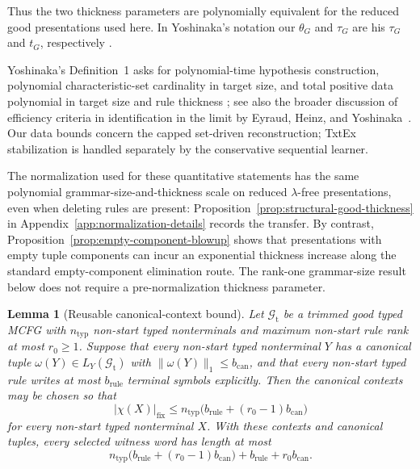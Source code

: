 \documentclass[11pt]{article}
\numberwithin{equation}{section}
\theoremstyle{plain}
\newtheorem{lemma}[theorem]{Lemma}
\theoremstyle{definition}
\theoremstyle{remark}
\begin{document}
Thus the two thickness parameters are polynomially equivalent for the reduced
good presentations used here.  In Yoshinaka's notation our $\theta_G$ and
$\tau_G$ are his $\tau_G$ and $t_G$, respectively
\cite[Section~4.3]{Yoshinaka2011}.

Yoshinaka's Definition~1 asks for polynomial-time hypothesis construction,
polynomial characteristic-set cardinality in target size, and total positive
data polynomial in target size and rule thickness
\cite[Definition~1]{Yoshinaka2011}; see also the broader discussion of
efficiency criteria in identification in the limit by Eyraud, Heinz, and
Yoshinaka~\cite{EyraudHeinzYoshinaka2016}.  Our data bounds concern the capped
set-driven reconstruction; TxtEx stabilization is handled separately by the
conservative sequential learner.

The normalization used for these quantitative statements has the same
polynomial grammar-size-and-thickness scale on reduced $\lambda$-free
presentations, even when deleting rules are present:
Proposition~\ref{prop:structural-good-thickness} in
Appendix~\ref{app:normalization-details} records the transfer.  By contrast,
Proposition~\ref{prop:empty-component-blowup} shows that presentations with
empty tuple components can incur an exponential thickness increase along the
standard empty-component elimination route.  The rank-one grammar-size result
below does not require a pre-normalization thickness parameter.

\begin{lemma}[Reusable canonical-context bound]

\label{lem:reusable-context-bound}
Let $\mathcal G_{\mathrm t}$ be a trimmed good typed MCFG
with $n_{\mathrm{typ}}$ non-start typed nonterminals and maximum non-start rule rank at most
$r_0\ge1$.  Suppose that every non-start typed nonterminal $Y$ has a canonical tuple
$\omega(Y)\in L_Y(\mathcal G_{\mathrm t})$ with
$\|\omega(Y)\|_1\le b_{\mathrm{can}}$, and that every non-start typed rule writes at
most $b_{\mathrm{rule}}$ terminal symbols explicitly.  Then the
canonical contexts may be chosen so that
\[
  |\chi(X)|_{\mathrm{fix}}
  \le n_{\mathrm{typ}}\bigl(b_{\mathrm{rule}}+(r_0-1)b_{\mathrm{can}}\bigr)
\]
for every non-start typed nonterminal $X$.  With these contexts and canonical tuples,
every selected witness word has length at most
\[
  n_{\mathrm{typ}}\bigl(b_{\mathrm{rule}}+(r_0-1)b_{\mathrm{can}}\bigr)+b_{\mathrm{rule}}+r_0b_{\mathrm{can}}.
\]
\end{lemma}
\end{document}
